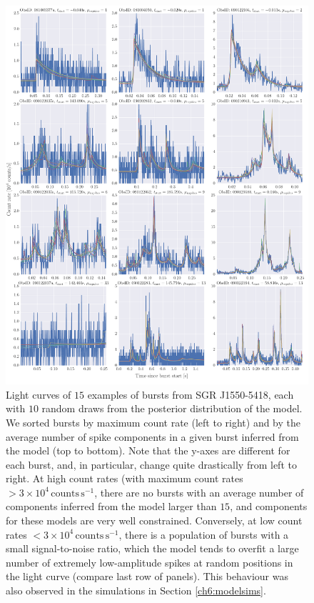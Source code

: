 \documentclass[12pt]{emulateapj}
\begin{document}
\begin{figure}[htbp]
\includegraphics[width=\textwidth]{f4b.pdf}%
\caption{Light curves of $15$ examples of bursts from SGR J1550-5418, each with $10$ random draws from the posterior distribution of the model. We sorted bursts by maximum count rate 
(left to right) and by the average number of spike components in a given burst inferred from the model (top to bottom). Note that the y-axes are different for each burst, and, in particular, change
quite drastically from left to right. At high count rates 
(with maximum count rates $ > 3\times10^{4}\,\mathrm{counts}\,\mathrm{s}^{-1}$, there are no bursts with an average number of components inferred from the model larger than $15$, and components
 for these models are very well constrained. Conversely, at low count rates $< 3\times10^{4}\,\mathrm{counts}\,\mathrm{s}^{-1}$, there is a population of bursts with a small signal-to-noise ratio, which the 
 model tends to overfit a large number of extremely low-amplitude spikes at random positions in the light curve (compare last row of panels). This behaviour was also observed in the simulations in Section 
 \ref{ch6:modelsims}.}
\label{fig:lcpanel}
\end{figure}
\end{document}
